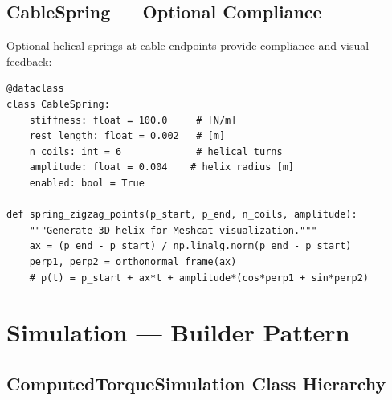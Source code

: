 \documentclass[11pt,a4paper]{article}
\begin{document}
\subsection{CableSpring --- Optional Compliance}

Optional helical springs at cable endpoints provide compliance and visual feedback:

\begin{lstlisting}[caption={Spring visualization --- \texttt{cable.py}}]
@dataclass
class CableSpring:
    stiffness: float = 100.0     # [N/m]
    rest_length: float = 0.002   # [m]
    n_coils: int = 6             # helical turns
    amplitude: float = 0.004    # helix radius [m]
    enabled: bool = True

def spring_zigzag_points(p_start, p_end, n_coils, amplitude):
    """Generate 3D helix for Meshcat visualization."""
    ax = (p_end - p_start) / np.linalg.norm(p_end - p_start)
    perp1, perp2 = orthonormal_frame(ax)
    # p(t) = p_start + ax*t + amplitude*(cos*perp1 + sin*perp2)
\end{lstlisting}


\section{Simulation --- Builder Pattern}
\label{sec:sim}

\subsection{ComputedTorqueSimulation Class Hierarchy}
\end{document}
